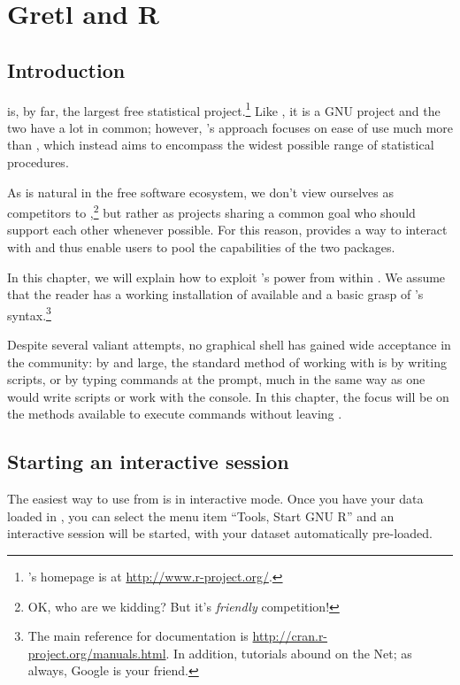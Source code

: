 \chapter{Gretl and R}
\label{chap:gretlR}

\section{Introduction}
\label{R-intro}

 is, by far, the largest free statistical
project.\footnote{'s homepage is at
  \url{http://www.r-project.org/}.} Like , it is a GNU
project and the two have a lot in common; however, 's
approach focuses on ease of use much more than , which instead
aims to encompass the widest possible range of statistical procedures.

As is natural in the free software ecosystem, we don't view ourselves
as competitors to ,\footnote{OK, who are we kidding? But it's
  \emph{friendly} competition!} but rather as projects sharing a common
goal who should support each other whenever possible. For this reason,
 provides a way to interact with  and thus enable
users to pool the capabilities of the two packages.

In this chapter, we will explain how to exploit 's power from
within . We assume that the reader has a working
installation of  available and a basic grasp of 's
syntax.\footnote{The main reference for  documentation is
  \url{http://cran.r-project.org/manuals.html}.  In addition, 
  tutorials abound on the Net; as always, Google is your friend.}

Despite several valiant attempts, no graphical shell has gained wide
acceptance in the  community: by and large, the standard method
of working with  is by writing scripts, or by typing commands
at the  prompt, much in the same way as one would write
 scripts or work with the  console. In this
chapter, the focus will be on the methods available to execute 
commands without leaving .

\section{Starting an interactive  session}
\label{sec:R-interactive}

The easiest way to use  from  is in interactive
mode.  Once you have your data loaded in , you can select
the menu item ``Tools, Start GNU R'' and an interactive 
session will be started, with your dataset automatically pre-loaded.

